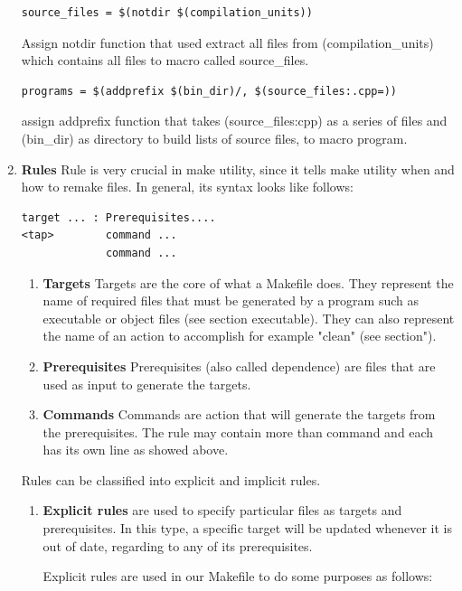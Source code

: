 \documentclass[11pt]{report}
\begin{document}
\begin{enumerate}
\begin{verbatim}
source_files = $(notdir $(compilation_units))
\end{verbatim}
Assign notdir function that used extract all files from (compilation\_units) which contains all files to macro called source\_files.

\begin{verbatim}
programs = $(addprefix $(bin_dir)/, $(source_files:.cpp=))
\end{verbatim}
assign addprefix function that takes (source\_files:cpp) as a series of files and (bin\_dir) as directory to build lists of source files, to macro program.

\item \textbf{Rules} Rule is very crucial in make utility, since it tells make utility when and how to remake files. In general, its syntax looks like follows:
\begin{verbatim}
target ... : Prerequisites....
<tap>        command ...
             command ...
\end{verbatim}

\begin{enumerate}
\item \textbf{Targets} Targets are the core of what a Makefile does. They represent the name of required files that must be generated by a program such as executable or object files (see section executable). They can also represent the name of an action to accomplish for example "clean" (see section").

\item \textbf{Prerequisites} Prerequisites (also called dependence) are files that are used as input to generate the targets.

\item \textbf{Commands} Commands are action that will generate the targets from the prerequisites. The rule may contain more than command and each has its own line as showed above.
\end{enumerate}

Rules can be classified into explicit and implicit rules. 
\begin{enumerate}
\item \textbf{Explicit rules} are used to specify particular files as targets and prerequisites. In this type, a specific target will be updated whenever it is out of date, regarding to any of its prerequisites.

Explicit rules are used in our Makefile to do some purposes as follows:


\end{enumerate}
\end{enumerate}
\end{document}
